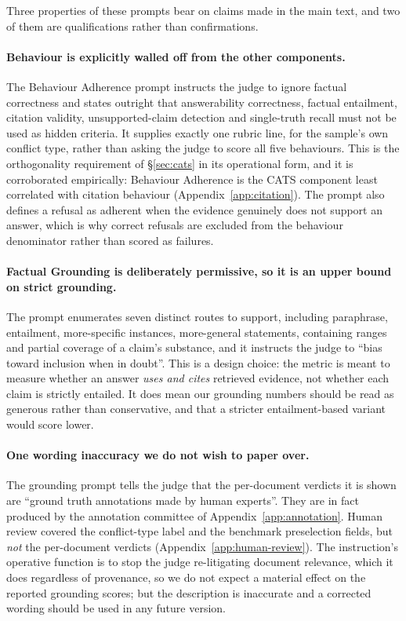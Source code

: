 Three properties of these prompts bear on claims made in the main text, and two
of them are qualifications rather than confirmations.

\paragraph{Behaviour is explicitly walled off from the other components.} The
Behaviour Adherence prompt instructs the judge to ignore factual correctness and
states outright that answerability correctness, factual entailment, citation
validity, unsupported-claim detection and single-truth recall must not be used as
hidden criteria. It supplies exactly one rubric line, for the sample's own
conflict type, rather than asking the judge to score all five behaviours. This is
the orthogonality requirement of \S\ref{sec:cats} in its operational form, and it
is corroborated empirically: Behaviour Adherence is the CATS component least
correlated with citation behaviour (Appendix~\ref{app:citation}). The prompt also
defines a refusal as adherent when the evidence genuinely does not support an
answer, which is why correct refusals are excluded from the behaviour denominator
rather than scored as failures.

\paragraph{Factual Grounding is deliberately permissive, so it is an upper bound
on strict grounding.} The prompt enumerates seven distinct routes to support,
including paraphrase, entailment, more-specific instances, more-general
statements, containing ranges and partial coverage of a claim's substance, and it
instructs the judge to ``bias toward inclusion when in doubt''. This is a design
choice: the metric is meant to measure whether an answer \emph{uses and cites}
retrieved evidence, not whether each claim is strictly entailed. It does mean our
grounding numbers should be read as generous rather than conservative, and that a
stricter entailment-based variant would score lower.

\paragraph{One wording inaccuracy we do not wish to paper over.} The grounding
prompt tells the judge that the per-document verdicts it is shown are ``ground
truth annotations made by human experts''. They are in fact produced by the
annotation committee of Appendix~\ref{app:annotation}. Human review covered the
conflict-type label and the benchmark preselection fields, but \emph{not} the
per-document verdicts (Appendix~\ref{app:human-review}). The instruction's
operative function is to stop the judge re-litigating document relevance, which it
does regardless of provenance, so we do not expect a material effect on the
reported grounding scores; but the description is inaccurate and a corrected
wording should be used in any future version.

